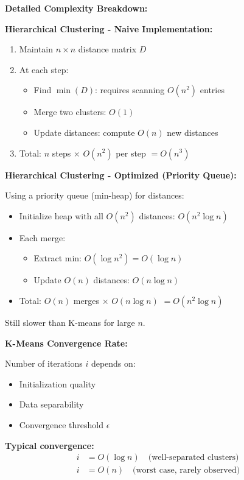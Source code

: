 \documentclass[12pt]{article}
\begin{document}
\begin{explanation}

\textbf{Detailed Complexity Breakdown:}

\textbf{Hierarchical Clustering - Naive Implementation:}

\begin{enumerate}
\item Maintain $n \times n$ distance matrix $D$
\item At each step:
   \begin{itemize}
   \item Find $\min(D)$: requires scanning $O(n^2)$ entries
   \item Merge two clusters: $O(1)$
   \item Update distances: compute $O(n)$ new distances
   \end{itemize}
\item Total: $n$ steps $\times$ $O(n^2)$ per step $= O(n^3)$
\end{enumerate}

\textbf{Hierarchical Clustering - Optimized (Priority Queue):}

Using a priority queue (min-heap) for distances:
\begin{itemize}
\item Initialize heap with all $O(n^2)$ distances: $O(n^2 \log n)$
\item Each merge:
   \begin{itemize}
   \item Extract min: $O(\log n^2) = O(\log n)$
   \item Update $O(n)$ distances: $O(n \log n)$
   \end{itemize}
\item Total: $O(n)$ merges $\times$ $O(n \log n)$ $= O(n^2 \log n)$
\end{itemize}

Still slower than K-means for large $n$.

\textbf{K-Means Convergence Rate:}

Number of iterations $i$ depends on:
\begin{itemize}
\item Initialization quality
\item Data separability
\item Convergence threshold $\epsilon$
\end{itemize}

\textbf{Typical convergence:}
\begin{align*}
i &= O(\log n) \quad \text{(well-separated clusters)} \\
i &= O(n) \quad \text{(worst case, rarely observed)}
\end{align*}


\end{explanation}
\end{document}
